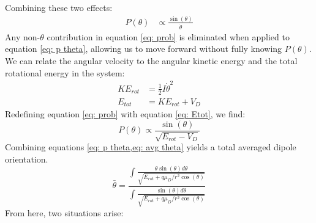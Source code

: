 Combining these two effects:
\begin{align}
    P(\theta) & \propto \frac{\sin(\theta)}{\dot{\theta}} \label{eq: prob}
\end{align}
Any non-$\theta$ contribution in equation \ref{eq: prob} is eliminated when applied to equation \ref{eq: p theta}, allowing us to move forward without fully knowing $P(\theta)$. We can relate the angular velocity to the angular kinetic energy and the total rotational energy in the system:
\begin{align}
    KE_{rot} & = \frac{1}{2}I\dot{\theta}^2 \nonumber \\
    E_{tot} & = KE_{rot} + V_D \label{eq: Etot}
\end{align}
Redefining equation \ref{eq: prob} with equation \ref{eq: Etot}, we find:
\begin{equation}
    P(\theta) \propto \frac{\sin(\theta)}{\sqrt{E_{rot}-V_D}} \label{eq: p theta}
\end{equation}
Combining equations \cref{eq: p theta,eq: avg theta} yields a total averaged dipole orientation.
\begin{equation}
    \bar{\theta} = \dfrac{\displaystyle \int\frac{\theta \sin(\theta)d\theta}{\sqrt{E_{rot}+q\mu_D/r^2 \cos(\theta)}}}{\displaystyle \int\frac{\sin(\theta)d\theta}{\sqrt{E_{rot}+q\mu_D/r^2 \cos(\theta)}}} \label{eq: avg theta int}
\end{equation}
From here, two situations arise:
